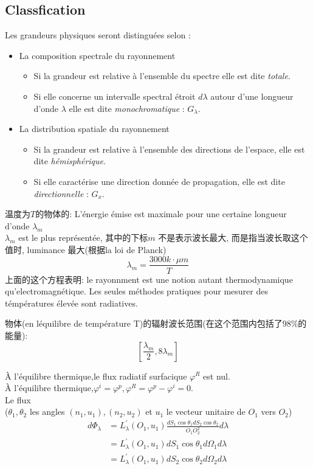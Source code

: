 \documentclass{article}
\begin{document}
\subsection{Classfication}
Les grandeurs physiques seront distingu\'ees selon :
\begin{itemize}
\item La composition spectrale du rayonnement
    \begin{itemize}
    \item Si la grandeur est relative \`a l'ensemble du spectre elle est dite \textit{totale}.
    \item Si elle concerne un intervalle spectral \'etroit $d \lambda$  autour d'une longueur d'onde $\lambda$  elle est dite \textit{monochromatique} : $G_{\lambda }$.
    \end{itemize}

\item La distribution spatiale du rayonnement
    \begin{itemize}
    \item Si la grandeur est relative \`a l'ensemble des directions de l'espace, elle est dite \textit{h\'emisph\'erique}.
    \item Si elle caract\'erise une direction donn\'ee de propagation, elle est dite \textit{directionnelle} : $G_x$.
    \end{itemize}
\end{itemize}
温度为$T$的物体的:
L'\'energie \'emise est maximale pour une certaine longueur d'onde $\lambda _m$\\
$\lambda_m$ est le plus repr\'esent\'ee, 其中的下标$m$ 不是表示波长最大, 而是指当波长取这个值时, luminance 最大(根据la loi de Planck)
$$\lambda _m=\frac{3000k\cdot \mu m}{T}$$
上面的这个方程表明: le rayonnment est une notion autant thermodynamique qu'electromagn\'etique. Les seules m\'ethodes pratiques pour mesurer des t\'emp\'eratures \'elev\'ee sont radiatives.

物体(en l\'equilibre de temp\'erature T)的辐射波长范围(在这个范围内包括了$98\%$的能量):
$$[\frac{\lambda _m }{2},8 \lambda _m]$$

\noindent
\`A l'\'equilibre thermique,le flux radiatif surfacique $\varphi^R$ est nul.\\
\`A l'\'equilibre thermique,$\varphi^i=\varphi^p,\varphi^R=\varphi^p-\varphi^i=0$. \\
Le flux\\
($\theta_1,\theta_2$ les angles $(n_1,u_1),(n_2,u_2)$ et $u_1$ le vecteur unitaire de $O_1$ vers $O_2$)
\begin{equation}
\begin{aligned}
d \Phi_{\lambda} 
& = L^{'}_{\lambda}(O_1,u_1) \frac{d S_1 \cos \theta_1  d S_2 \cos \theta_2}{O_1 O_2^2} d \lambda \\
& = L^{'}_{\lambda}(O_1,u_1) d S_1 \cos \theta_1 d\Omega_1 d \lambda \\
& = L^{'}_{\lambda}(O_1,u_1) d S_2 \cos \theta_2 d\Omega_2 d \lambda
\end{aligned}
\end{equation}
\end{document}
